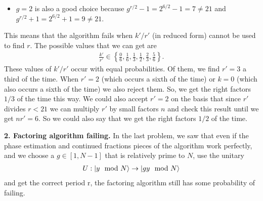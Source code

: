 \documentclass{article}
\theoremstyle{definition}
\newcommand{\f}[2]{\frac{#1}{#2}}
\newcommand{\lc}{\left\{}
\newcommand{\rc}{\right\}}
\begin{document}
\begin{enumerate}[label=(\alph*)]
\begin{itemize}
\item $g=2$ is also a good choice because $g^{r/2} - 1 = 2^{6/2}-1 = 7 \neq 21$ and $g^{r/2} + 1 = 2^{6/2}+1 = 9 \neq 21$. 
\end{itemize}
This means that the algorithm fails when $k'/r'$ (in reduced form) cannot be used to find $r$. The possible values that we can get are
\begin{align*}
\f{k'}{r'} \in \lc \f{0}{6}, \f{1}{6}, \f{1}{3}, \f{1}{2}, \f{2}{3}, \f{5}{6} \rc.
\end{align*}
These values of $k'/r'$ occur with equal probabilities. Of them, we find $r' = 3$ a third  of the time. When $r'=2$ (which occurs a sixth of the time) or $k=0$ (which also occurs a sixth of the time) we also reject them. So, we get the right factors $\boxed{1/3}$ of the time this way. We could also accept $r'=2$ on the basis that since $r'$ divides $r < 21$ we can multiply $r'$ by small factors $n$ and check this result until we get $nr'=6$.  So we could also say that we get the right factors $\boxed{1/2}$ of the time. 

\end{enumerate}

\newpage

\noindent \textbf{2. Factoring algorithm failing.} In the last problem, we saw that even if the phase estimation and continued fractions pieces of the algorithm work perfectly, and we choose a  $g\in [1,N-1]$ that is relatively prime to $N$, use the unitary
\begin{align*}
U : \ket{ y \mod N}  \to \ket{gy \mod N}
\end{align*}
and get the correct period r, the factoring algorithm still has some probability of failing.
\end{document}
